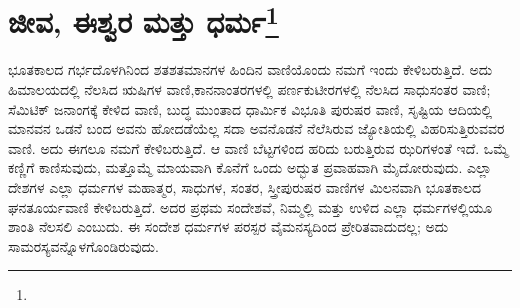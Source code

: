 
\chapter[ಜೀವ, ಈಶ್ವರ ಮತ್ತು ಧರ್ಮ]{ಜೀವ, ಈಶ್ವರ ಮತ್ತು ಧರ್ಮ\protect\footnote{}}

ಭೂತಕಾಲದ ಗರ್ಭದೊಳಗಿನಿಂದ ಶತಶತಮಾನಗಳ ಹಿಂದಿನ ವಾಣಿಯೊಂದು ನಮಗೆ ಇಂದು ಕೇಳಿಬರುತ್ತಿದೆ. ಅದು ಹಿಮಾಲಯದಲ್ಲಿ ನೆಲಸಿದ ಋಷಿಗಳ ವಾಣಿ,\break ಕಾನನಾಂತರಗಳಲ್ಲಿ ಪರ್ಣಕುಟೀರಗಳಲ್ಲಿ ನೆಲಸಿದ ಸಾಧುಸಂತರ ವಾಣಿ; ಸೆಮಿಟಿಕ್ ಜನಾಂಗಕ್ಕೆ ಕೇಳಿದ ವಾಣಿ, ಬುದ್ಧ ಮುಂತಾದ ಧಾರ್ಮಿಕ ವಿಭೂತಿ ಪುರುಷರ ವಾಣಿ, ಸೃಷ್ಟಿಯ ಆದಿಯಲ್ಲಿ ಮಾನವನ ಒಡನೆ ಬಂದ ಅವನು ಹೋದಡೆಯೆಲ್ಲ ಸದಾ ಅವನೊಡನೆ ನೆಲೆಸಿರುವ ಜ್ಯೋತಿಯಲ್ಲಿ ವಿಹರಿಸುತ್ತಿರುವವರ ವಾಣಿ. ಅದು ಈಗಲೂ ನಮಗೆ ಕೇಳಿಬರುತ್ತಿದೆ. ಆ ವಾಣಿ ಬೆಟ್ಟಗಳಿಂದ ಹರಿದು ಬರುತ್ತಿರುವ ಝರಿಗಳಂತೆ ಇದೆ. ಒಮ್ಮೆ ಕಣ್ಣಿಗೆ ಕಾಣಿಸುವುದು, ಮತ್ತೊಮ್ಮೆ ಮಾಯವಾಗಿ ಕೊನೆಗೆ ಒಂದು ಅದ್ಭುತ ಪ್ರವಾಹವಾಗಿ ಮೈದೋರುವುದು. ಎಲ್ಲಾ ದೇಶಗಳ ಎಲ್ಲಾ ಧರ್ಮಗಳ ಮಹಾತ್ಮರ, ಸಾಧುಗಳ, ಸಂತರ, ಸ್ತ್ರೀಪುರುಷರ ವಾಣಿಗಳ ಮಿಲನವಾಗಿ ಭೂತಕಾಲದ ಘನತೂರ್ಯವಾಣಿ ಕೇಳಿಬರುತ್ತಿದೆ. ಅದರ ಪ್ರಥಮ ಸಂದೇಶವೆ, ನಿಮ್ಮಲ್ಲಿ ಮತ್ತು ಉಳಿದ ಎಲ್ಲಾ ಧರ್ಮಗಳಲ್ಲಿಯೂ ಶಾಂತಿ ನೆಲಸಲಿ ಎಂಬುದು. ಈ ಸಂದೇಶ ಧರ್ಮಗಳ ಪರಸ್ಪರ ವೈಮನಸ್ಯದಿಂದ ಪ್ರೇರಿತವಾದುದಲ್ಲ; ಅದು ಸಾಮರಸ್ಯವನ್ನೊಳಗೊಂಡಿರುವುದು.

